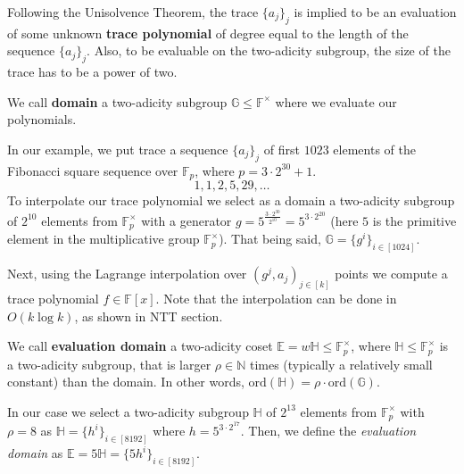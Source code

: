 \documentclass[../lecture-notes.tex]{subfiles}
\begin{document}
Following the Unisolvence Theorem, the trace $\{a_j\}_j$ is implied to be an evaluation
of some unknown \textbf{trace polynomial} of degree equal to the length of the 
sequence $\{a_j\}_j$. Also, to be
evaluable on the two-adicity subgroup, the size of the trace has to be a power
of two.

\begin{definition}
We call \textbf{domain} a two-adicity subgroup $\mathbb{G} \leq
\mathbb{F}^{\times}$ where we evaluate our polynomials.
\end{definition}

\begin{example}
In our example, we put trace a sequence $\{a_j\}_j$ of first $1023$ elements of
the Fibonacci square sequence over $\mathbb{F}_p$, where $p=3\cdot 2^{30} + 1$.
\begin{equation*}
1, 1, 2, 5, 29, \ldots
\end{equation*}
To interpolate our trace polynomial we select as a domain a two-adicity subgroup
of $2^{10}$ elements from $\mathbb{F}^\times_p$ with a generator $g =
5^{\frac{3\cdot 2^{30}}{2^{10}}} = 5^{3 \cdot 2^{20}}$ (here $5$ is the
primitive element in the multiplicative group $\mathbb{F}^\times_p$). That being
said, $\mathbb{G} = \{g^i\}_{i \in [1024]}$.
\end{example}

Next, using the Lagrange interpolation over $(g^j, a_j)_{j \in [k]}$ points
we compute a trace polynomial $f \in \mathbb{F}[x]$. Note that the interpolation 
can be done in $O(k\log k)$, as shown in NTT section.

\begin{definition}
We call \textbf{evaluation domain} a two-adicity coset $\mathbb{E} = w\mathbb{H}
\leq \mathbb{F}_p^{\times}$, where $\mathbb{H} \leq \mathbb{F}_p^{\times}$ is a
two-adicity subgroup, that is larger $\rho \in \mathbb{N}$ times (typically a
relatively small constant) than the domain. In other words,
$\text{ord}(\mathbb{H}) = \rho \cdot \text{ord}(\mathbb{G})$.
\end{definition}

\begin{example}
In our case we select a two-adicity subgroup $\mathbb{H}$ of $2^{13}$ elements
from $\mathbb{F}_p^\times$ with $\rho = 8$ as $\mathbb{H} = \{h^i\}_{i \in
[8192]}$ where $h = 5^{3 \cdot 2^{17}}$. Then, we define the \emph{evaluation
domain} as $\mathbb{E}=5\mathbb{H} = \{5h^i\}_{i \in [8192]}$.
\end{example}
\end{document}
